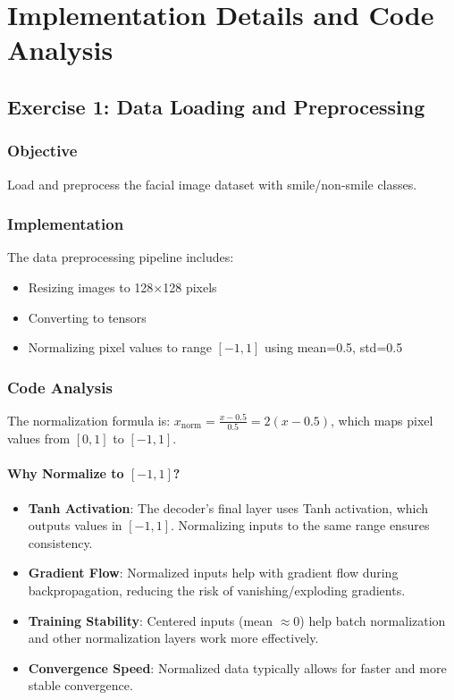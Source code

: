 \documentclass[conference]{IEEEtran}
\begin{document}
\section{Implementation Details and Code Analysis}

\subsection{Exercise 1: Data Loading and Preprocessing}

\subsubsection{Objective}
Load and preprocess the facial image dataset with smile/non-smile classes.

\subsubsection{Implementation}
The data preprocessing pipeline includes:
\begin{itemize}
    \item Resizing images to 128×128 pixels
    \item Converting to tensors
    \item Normalizing pixel values to range $[-1, 1]$ using mean=0.5, std=0.5
\end{itemize}

\subsubsection{Code Analysis}
The normalization formula is: $x_{\text{norm}} = \frac{x - 0.5}{0.5} = 2(x - 0.5)$, which maps pixel values from $[0, 1]$ to $[-1, 1]$.

\paragraph{Why Normalize to $[-1, 1]$?}
\begin{itemize}
    \item \textbf{Tanh Activation}: The decoder's final layer uses Tanh activation, which outputs values in $[-1, 1]$. Normalizing inputs to the same range ensures consistency.
    \item \textbf{Gradient Flow}: Normalized inputs help with gradient flow during backpropagation, reducing the risk of vanishing/exploding gradients.
    \item \textbf{Training Stability}: Centered inputs (mean $\approx 0$) help batch normalization and other normalization layers work more effectively.
    \item \textbf{Convergence Speed}: Normalized data typically allows for faster and more stable convergence.
\end{itemize}
\end{document}
